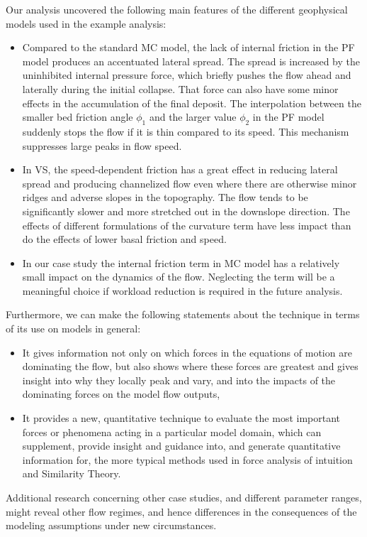 \documentclass{article}
\begin{document}
Our analysis uncovered the following main features of the different geophysical models used in the example analysis:
\begin{itemize}
  \item Compared to the standard MC model, the lack of internal friction in the PF model produces an accentuated lateral spread. The spread is increased by the uninhibited internal pressure force, which briefly pushes the flow ahead and laterally during the initial collapse. That force can also have some minor effects in the accumulation of the final deposit. The interpolation between the smaller bed friction angle $\phi_1$ and the larger value $\phi_2$ in the PF model suddenly stops the flow if it is thin compared to its speed. This mechanism suppresses large peaks in flow speed.
  \item In VS, the speed-dependent friction has a great effect in reducing lateral spread and producing channelized flow even where there are otherwise minor ridges and adverse slopes in the topography. The flow tends to be significantly slower and more stretched out in the downslope direction. The effects of different formulations of the curvature term have less impact than do the effects of lower basal friction and speed.
  \item In our case study the internal friction term in MC model has a relatively small impact on the dynamics of the flow. Neglecting the term will be a meaningful choice if workload reduction is required in the future analysis.
\end{itemize}

Furthermore, we can make the following statements about the technique in terms of its use on models in general:
\begin{itemize}
\item It gives information not only on which forces in the equations of motion are dominating the flow, but also shows where these forces are greatest and gives insight into why they locally peak and vary, and into the impacts of the dominating forces on the model flow outputs,
\item It provides a new, quantitative technique to evaluate the most important forces or phenomena acting in a particular model domain, which can supplement, provide insight and guidance into, and generate quantitative information for, the more typical methods used in force analysis of intuition and Similarity Theory.
\end{itemize}

Additional research concerning other case studies, and different parameter ranges, might reveal other flow regimes, and hence differences in the consequences of the modeling assumptions under new circumstances.
\end{document}
